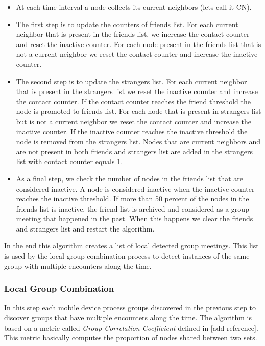 \begin{itemize}
	\item At each time interval a node collects its current neighbors (lets call it CN).
	\item The first step is to update the counters of friends list. For each current neighbor that is present in the friends
	list, we increase the contact counter and reset the inactive counter. For each node present in the friends list that is
	not a current neighbor we reset the contact counter and increase the inactive counter.
	\item The second step is to update the strangers list. For each current neighbor that is present in the strangers list
	we reset the inactive counter and increase the contact counter. If the contact counter reaches the friend threshold
	the node is promoted to friends list. For each node that is present in strangers list but is not a current neighbor
	we reset the contact counter and increase the inactive counter. If the inactive counter reaches the inactive threshold
	the node is removed from the strangers list. Nodes that are current neighbors and are not present in both friends and strangers
	list are added in the strangers list with contact counter equals 1.
	\item As a final step, we check the number of nodes in the friends list that are considered inactive. A node is considered
	inactive when the inactive counter reaches the inactive threshold. If more than 50 percent of the nodes in the friends list
	is inactive, the friend list is archived and considered as a group meeting that happened in the past. When this happens we
	clear the friends and strangers list and restart the algorithm.
\end{itemize}

In the end this algorithm creates a list of local detected group meetings. This list is used by the local group combination process to
detect instances of the same group with multiple encounters along the time.

\subsubsection{Local Group Combination}

In this step each mobile device process groups discovered in the previous step to discover groups that
have multiple encounters along the time. The algorithm is based on a metric called \textit{Group Correlation Coefficient} defined in [add-reference]. This metric basically computes the proportion of nodes shared between two sets.

